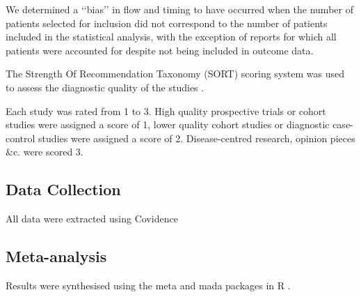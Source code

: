 We determined a ‘‘bias’’ in flow and timing to have occurred when the number of patients selected for inclusion did not correspond to the number of patients included in the statistical analysis, with the exception of reports for which all patients were accounted for despite not being included in outcome data. 


The Strength Of Recommendation Taxonomy (SORT) scoring system was used to assess the diagnostic quality of the studies \cite{ebellStrengthRecommendationTaxonomy2004}.

Each study was rated from 1 to 3. High quality prospective trials or cohort studies were assigned a score of 1, lower quality cohort studies or diagnostic case-control studies were assigned a score of 2. Disease-centred research, opinion pieces \&c. were scored 3.

\subsection{Data Collection}

All data were extracted using Covidence \cite{Covidence}



\subsection{Meta-analysis}

Results were synthesised using the meta \cite{balduzziHowPerformMetaanalysis2019} and mada \cite{doeblerMadaMetaAnalysisDiagnostic2020} packages in R \cite{r-core}. 
